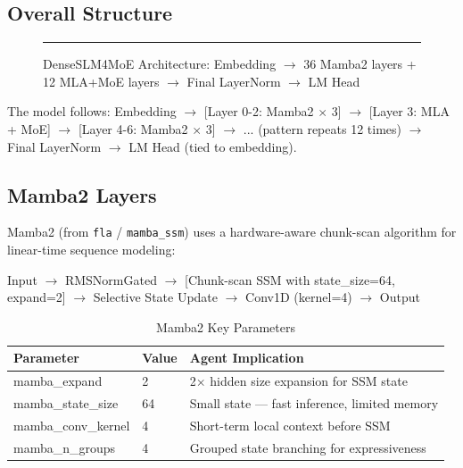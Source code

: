 \subsection{Overall Structure}

\begin{figure}[h!]
    \centering
    \rule{0.8\textwidth}{0.3\textwidth}
    \caption{DenseSLM4MoE Architecture: Embedding $\rightarrow$ 36 Mamba2 layers + 12 MLA+MoE layers $\rightarrow$ Final LayerNorm $\rightarrow$ LM Head}
    \label{fig:architecture}
\end{figure}

The model follows: Embedding $\rightarrow$ [Layer 0-2: Mamba2 $\times$ 3] $\rightarrow$ [Layer 3: MLA + MoE] $\rightarrow$ [Layer 4-6: Mamba2 $\times$ 3] $\rightarrow$ ... (pattern repeats 12 times) $\rightarrow$ Final LayerNorm $\rightarrow$ LM Head (tied to embedding).

\subsection{Mamba2 Layers}

Mamba2 \citep{mamba2} (from \texttt{fla} / \texttt{mamba\_ssm}) uses a hardware-aware chunk-scan algorithm for linear-time sequence modeling:

\begin{algorithm}[H]
\caption{Mamba2 Layer Forward}
\begin{algorithmic}
\STATE Input $\rightarrow$ RMSNormGated $\rightarrow$ [Chunk-scan SSM with state\_size=64, expand=2]
\STATE $\rightarrow$ Selective State Update $\rightarrow$ Conv1D (kernel=4) $\rightarrow$ Output
\end{algorithmic}
\end{algorithm}

\begin{table}[ht!]
    \centering
    \caption{Mamba2 Key Parameters}
    \begin{tabular}{lll}
        \toprule
        \textbf{Parameter} & \textbf{Value} & \textbf{Agent Implication} \\
        \midrule
        mamba\_expand & 2 & 2$\times$ hidden size expansion for SSM state \\
        mamba\_state\_size & 64 & Small state --- fast inference, limited memory \\
        mamba\_conv\_kernel & 4 & Short-term local context before SSM \\
        mamba\_n\_groups & 4 & Grouped state branching for expressiveness \\
        \bottomrule
    \end{tabular}
\end{table}


